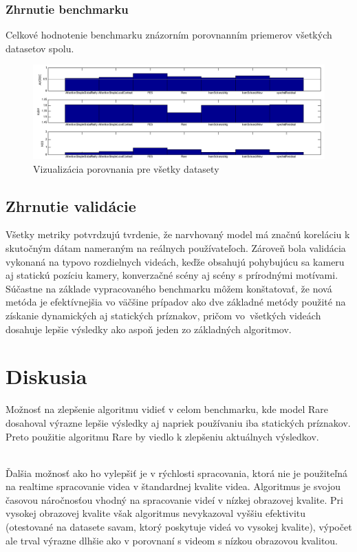 \subsubsection{Zhrnutie benchmarku}
Celkové hodnotenie benchmarku znázorním porovnanním priemerov všetkých datasetov spolu.

\begin{figure}[H]
  \includegraphics[width=15cm]{pics/benchmark.png}
  \caption{Vizualizácia porovnania pre všetky datasety}
\end{figure}

\subsection{Zhrnutie validácie}
Všetky metriky potvrdzujú tvrdenie, že narvhovaný model má značnú koreláciu k skutočným dátam nameraným na reálnych používateľoch.
Zároveň bola validácia vykonaná na typovo rozdielnych videách, keďže obsahujú pohybujúcu sa kameru aj statickú pozíciu kamery, konverzačné scény aj scény s prírodnými motívami.
Súčastne na základe vypracovaného benchmarku môžem konštatovať, že nová metóda je efektívnejšia vo väčšine prípadov ako dve základné metódy použité na získanie dynamických aj statických príznakov, pričom vo~všetkých videách dosahuje lepšie výsledky ako aspoň jeden zo základných algoritmov.

\section{Diskusia}
\label{ssec:diskusia}
Možnosť na zlepšenie algoritmu vidieť v celom benchmarku, kde model Rare\cite{rare-1} dosahoval výrazne lepšie výsledky aj napriek používaniu iba statických príznakov.
Preto použitie algoritmu Rare\cite{rare-1} by viedlo k zlepšeniu aktuálnych výsledkov.

\\

Ďalšia možnosť ako ho vylepšiť je v rýchlosti spracovania, ktorá nie je použiteľná na realtime spracovanie videa v štandardnej kvalite videa.
Algoritmus je svojou časovou náročnosťou vhodný na spracovanie videí v nízkej obrazovej kvalite.
Pri vysokej obrazovej kvalite však algoritmus nevykazoval vyššiu efektivitu (otestované na datasete savam\cite{savam}, ktorý poskytuje videá vo vysokej kvalite), výpočet ale trval výrazne dlhšie ako v porovnaní s videom s nízkou obrazovou kvalitou.


